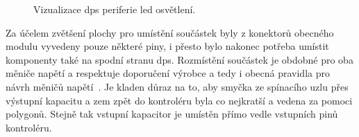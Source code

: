     \begin{figure}[!ht]
        \centering
        \caption{Vizualizace \acs{dps} periferie \acs{led} osvětlení.}
        \label{fig:perif-led-dps}
    \end{figure}

    Za účelem zvětšení plochy pro umístění součástek byly z konektorů obecného modulu vyvedeny pouze některé piny, i přesto bylo nakonec potřeba umístit komponenty také na spodní stranu \acs{dps}. Rozmístění součástek je obdobné pro oba měniče napětí a respektuje doporučení výrobce a tedy i obecná pravidla pro návrh měničů napětí~\cite{Diodes_AP63356Q}. Je kladen důraz na to, aby smyčka ze spínacího uzlu přes výstupní kapacitu a zem zpět do kontroléru byla co nejkratší a vedena za pomoci polygonů. Stejně tak vstupní kapacitor je umístěn přímo vedle vstupních pinů kontroléru.
    